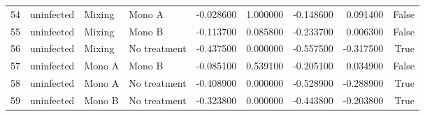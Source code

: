 \begin{tabular}{llllrrrrr}
54 & uninfected & Mixing & Mono A & -0.028600 & 1.000000 & -0.148600 & 0.091400 & False \\
55 & uninfected & Mixing & Mono B & -0.113700 & 0.085800 & -0.233700 & 0.006300 & False \\
56 & uninfected & Mixing & No treatment & -0.437500 & 0.000000 & -0.557500 & -0.317500 & True \\
57 & uninfected & Mono A & Mono B & -0.085100 & 0.539100 & -0.205100 & 0.034900 & False \\
58 & uninfected & Mono A & No treatment & -0.408900 & 0.000000 & -0.528900 & -0.288900 & True \\
59 & uninfected & Mono B & No treatment & -0.323800 & 0.000000 & -0.443800 & -0.203800 & True \\
\bottomrule
\end{tabular}
